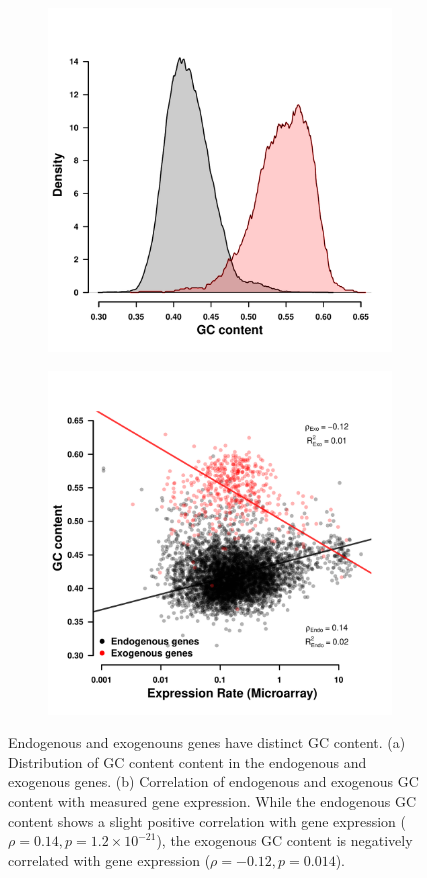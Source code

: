 \documentclass[doublespacing,linenumbers]{bmcart-modified}
\newcommand{\GC}{GC content\xspace}
\begin{document}
\begin{backmatter}
\begin{figure}
    \centering
    \begin{subfigure}
        \centering
       \includegraphics[width=.45\textwidth]{img/figS1a}
    \end{subfigure}
    \begin{subfigure}
        \centering
        \includegraphics[width=.45\textwidth]{img/figS1b}
    \end{subfigure}
    \caption{Endogenous and exogenouns genes have distinct \GC. 
    (a) Distribution of \GC content in the endogenous and exogenous genes.
    (b) Correlation of endogenous and exogenous \GC with measured gene expression. 
    While the endogenous \GC shows a slight positive correlation with gene expression ($\rho = 0.14, p = 1.2\times10^{-21}$), the exogenous \GC is negatively correlated with gene expression ($\rho = -0.12, p = 0.014$).}
    \label{fig:gc_comp_phi}
\end{figure}
\null
\vfill



\end{backmatter}
\end{document}
